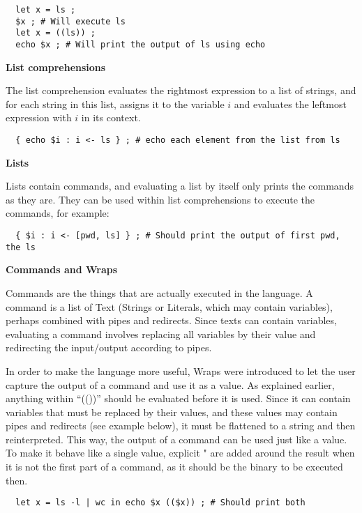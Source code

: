 \documentclass[11pt,a4paper]{article}
\begin{document}
\begin{verbatim}
  let x = ls ;
  $x ; # Will execute ls
  let x = ((ls)) ;
  echo $x ; # Will print the output of ls using echo
\end{verbatim}

\textbf{List comprehensions}

The list comprehension evaluates the rightmost expression to a list of strings,
and for each string in this list, assigns it to the variable $i$ and
evaluates the leftmost expression with $i$ in its context.

\begin{verbatim}
  { echo $i : i <- ls } ; # echo each element from the list from ls
\end{verbatim}

\textbf{Lists}

Lists contain commands, and evaluating a list by itself only prints the
commands as they are. They can be used within list comprehensions to execute
the commands, for example:

\begin{verbatim}
  { $i : i <- [pwd, ls] } ; # Should print the output of first pwd, the ls
\end{verbatim}

\textbf{Commands and Wraps}

Commands are the things that are actually executed in the language. A command
is a list of Text (Strings or Literals, which may contain variables), perhaps
combined with pipes and redirects. Since texts can contain variables,
evaluating a command involves replacing all variables by their value and
redirecting the input/output according to pipes.

In order to make the language more useful, Wraps were introduced to let the user
capture the output of a command and use it as a value. As explained earlier,
anything within ``(())'' should be evaluated before it is used. Since it can
contain variables that must be replaced by their values, and these values may
contain pipes and redirects (see example below), it must be flattened to a
string and then reinterpreted. This way, the output of a command can be used
just like a value. To make it behave like a single value, explicit " are added
around the result when it is not the first part of a command, as it should be
the binary to be executed then.

\begin{verbatim}
  let x = ls -l | wc in echo $x (($x)) ; # Should print both
\end{verbatim}
\end{document}
